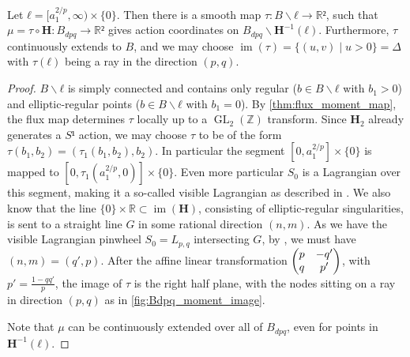\documentclass[12pt,a4paper,draft]{scrartcl}
\DeclareMathOperator{\im}{im}
\DeclareMathOperator{\GL}{GL}
\begin{document}
\begin{lemma}
  \label{thm:bdpq_moment_map}
  Let $ℓ = [a_1^{2/p},∞) × \{0\}$.
  Then there is a smooth map $τ: B ∖ ℓ → ℝ²$, such that $μ = τ ∘ \symbf{H} \colon B_{dpq} → ℝ²$ gives action coordinates on $B_{dpq} ∖ \symbf{H}^{-1}(ℓ)$.
  Furthermore, $τ$ continuously extends to $B$, and we may choose $\im(τ)=\{(u,v) \mid u>0\} = Δ$ with $τ(ℓ)$ being a ray in the direction $(p,q)$.
\end{lemma}


\begin{proof}
  $B ∖ ℓ$ is simply connected and contains only regular ($b ∈ B ∖ ℓ$ with $b_1>0$) and elliptic-regular points ($b ∈ B ∖ ℓ$ with $b_1 = 0$).
By \cref{thm:flux_moment_map}, the flux map determines $τ$ locally up to a $\GL_2(ℤ)$ transform.
Since $\symbf{H}_2$ already generates a $S¹$ action, we may choose $τ$ to be of the form $τ(b_1,b_2) = (τ_1(b_1,b_2), b_2)$.
In particular the segment $[0,a_1^{2/p}] × \{0\}$ is mapped to $[0,τ_1(a_1^{2/p},0)] × \{0\}$. Even more particular $S_0$ is a Lagrangian over this segment, making it a so-called visible Lagrangian as described in \cite[Chapter 5]{evans2021atfs}.
We also know that the line $\{0\} × ℝ ⊂ \im(\symbf{H})$, consisting of elliptic-regular singularities, is sent to a straight line $G$ in some rational direction $(n,m)$.
As we have the visible Lagrangian pinwheel $S_0 = L_{p,q}$ intersecting $G$, by \cite[Section 5.3]{evans2021atfs}, we must have $(n,m) = (q',p)$.
After the affine linear transformation $\mqty(p & -q'\\q & p')$, with $p' = \frac{1-qq'}{p}$, the image of $τ$ is the right half plane, with the nodes sitting on a ray in direction $(p,q)$ as in \cref{fig:Bdpq_moment_image}.

Note that $μ$ can be continuously extended over all of $B_{dpq}$, even for points in $\symbf{H}^{-1}(ℓ)$. 
\end{proof}
\end{document}
